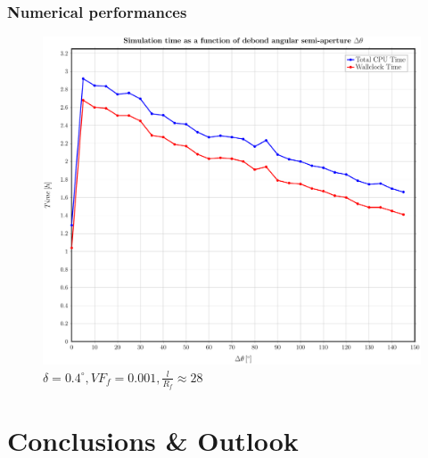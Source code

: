 \documentclass[first,firstsupp,lastsupp,handout,last,hyperref,table]{ETHclass}
\begin{document}
\begin{frame}
\frametitle{Numerical performances}
\vspace{-0.35cm}
\centering
\captionsetup[subfigure]{font=scriptsize,labelfont=scriptsize}
\begin{figure}[!h]
\centering
\includegraphics[height=0.7\textheight]{cpus-time.pdf}
 \caption{$\delta=0.4^{\circ},VF_{f}=0.001,\frac{l}{R_{f}}\approx28$}
  \label{fig:cpu-time}
\end{figure}
\end{frame}

\section[Conclusions]{Conclusions \& Outlook}
\end{document}
